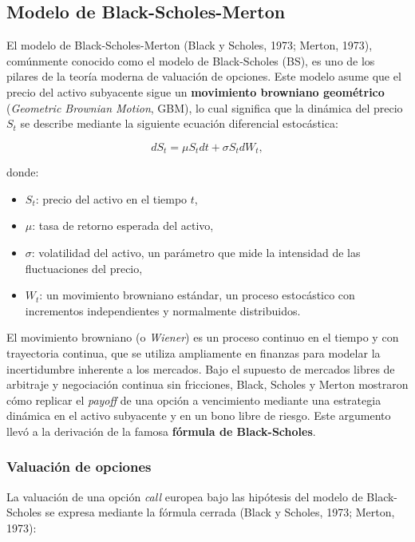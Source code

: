 \documentclass[11pt,a4paper,spanish]{article}
\numberwithin{equation}{section} %
\begin{document}
\subsection{Modelo de Black-Scholes-Merton}\label{subsec:bsm}

El modelo de Black-Scholes-Merton (Black y Scholes, 1973; Merton, 1973), comúnmente conocido como el modelo de Black-Scholes (BS), es uno de los pilares de la teoría moderna de valuación de opciones. Este modelo asume que el precio del activo subyacente sigue un \textbf{movimiento browniano geométrico} (\textit{Geometric Brownian Motion}, GBM), lo cual significa que la dinámica del precio $S_t$ se describe mediante la siguiente ecuación diferencial estocástica:

\begin{equation}
dS_t = \mu S_t dt + \sigma S_t dW_t,
\end{equation}

donde:
\begin{itemize}
    \item $S_t$: precio del activo en el tiempo $t$,
    \item $\mu$: tasa de retorno esperada del activo,
    \item $\sigma$: volatilidad del activo, un parámetro que mide la intensidad de las fluctuaciones del precio,
    \item $W_t$: un movimiento browniano estándar, un proceso estocástico con incrementos independientes y normalmente distribuidos.
\end{itemize}

El movimiento browniano (o \textit{Wiener}) es un proceso continuo en el tiempo y con trayectoria continua, que se utiliza ampliamente en finanzas para modelar la incertidumbre inherente a los mercados. Bajo el supuesto de mercados libres de arbitraje y negociación continua sin fricciones, Black, Scholes y Merton mostraron cómo replicar el \textit{payoff} de una opción a vencimiento mediante una estrategia dinámica en el activo subyacente y en un bono libre de riesgo. Este argumento llevó a la derivación de la famosa \textbf{fórmula de Black-Scholes}.

\subsubsection{Valuación de opciones}

La valuación de una opción \textit{call} europea bajo las hipótesis del modelo de Black-Scholes se expresa mediante la fórmula cerrada (Black y Scholes, 1973; Merton, 1973):
\end{document}
